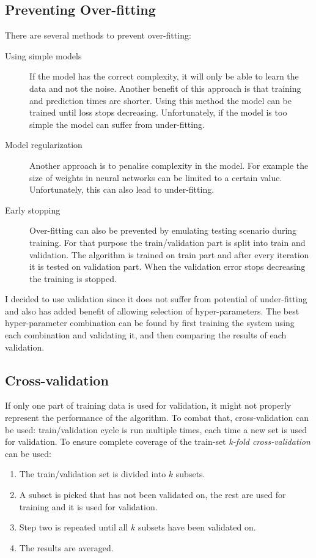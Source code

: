 \documentclass[12pt,a4paper]{book}
\begin{document}
\subsection{Preventing Over-fitting}
\label{overfitting}
There are several methods to prevent over-fitting:
\begin{description}
\item[Using simple models]
If the model has the correct complexity, it will only be able to learn the data and not the noise.
Another benefit of this approach is that training and prediction times are shorter.
Using this method the model can be trained until loss stops decreasing.
Unfortunately, if the model is too simple the model can suffer from under-fitting.

\item[Model regularization]
Another approach is to penalise complexity in the model.
For example the size of weights in neural networks can be limited to a certain value.
Unfortunately, this can also lead to under-fitting.

\item[Early stopping] 
Over-fitting can also be prevented by emulating testing scenario during training.
For that purpose the train/validation part is split into train and validation.
The algorithm is trained on train part and after every iteration it is tested on validation part.
When the validation error stops decreasing the training is stopped.
\end{description}
I decided to use validation since it does not suffer from potential of under-fitting and also has added benefit of allowing selection of hyper-parameters.
The best hyper-parameter combination can be found by first training the system using each combination and validating it, and then comparing the results of each validation.

\subsection{Cross-validation}
If only one part of training data is used for validation, it might not properly represent the performance of the algorithm.
To combat that, cross-validation can be used: train/validation cycle is run multiple times, each time a new set is used for validation.
To ensure complete coverage of the train-set \emph{k-fold cross-validation} can be used: 
\begin{enumerate}
\item The train/validation set is divided into $k$ subsets.
\item A subset is picked that has not been validated on, the rest are used for training and it is used for validation.
\item Step two is repeated until all $k$ subsets have been validated on.
\item The results are averaged.
\end{enumerate}
\end{document}
